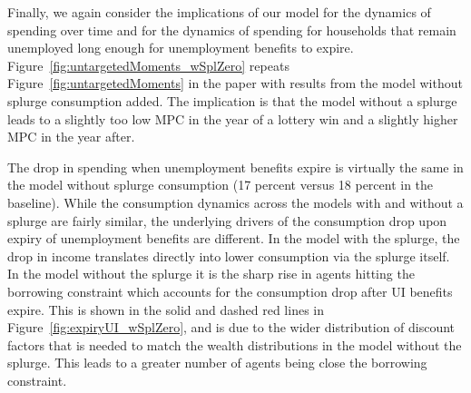 \documentclass[\econtexRoot/HAFiscal-online-appendix]{subfiles}
\begin{document}

Finally, we again consider the  implications of our model for the dynamics of spending over time and for the dynamics of spending for households that remain unemployed long enough for unemployment benefits to expire. Figure~\ref{fig:untargetedMoments_wSplZero} repeats Figure~\ref{fig:untargetedMoments} in the paper with results from the model without splurge consumption added. The implication is that the model without a splurge leads to a slightly too low MPC in the year of a lottery win and a slightly higher MPC in the year after.


The drop in spending when unemployment benefits expire is virtually the same in the model without splurge consumption (17 percent versus 18 percent in the baseline).
While the consumption dynamics across the models with and without a splurge are fairly similar, the underlying drivers of the consumption drop upon expiry of unemployment benefits are different.
In the model with the splurge, the drop in income translates directly into lower consumption via the splurge itself.
In the model without the splurge it is the sharp rise in agents hitting the borrowing constraint which accounts for the consumption drop after UI benefits expire.
This is shown in the solid and dashed red lines in Figure~\ref{fig:expiryUI_wSplZero}, and is due to the wider distribution of discount factors that is needed to match the wealth distributions in the model without the splurge. This leads to a greater number of agents being close the borrowing constraint.
\end{document}
